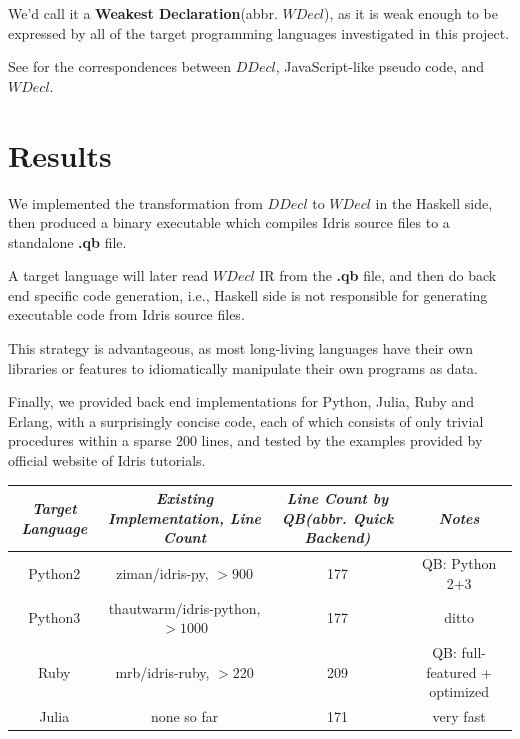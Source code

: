 \documentclass[a1,portrait]{a1poster}
\begin{document}
\begin{multicols}{2}
We'd call it a \textbf{Weakest Declaration}(abbr. $WDecl$), as it is weak enough to be expressed by
all of the target programming languages investigated in this project.

See  for the correspondences between $DDecl$, JavaScript-like pseudo code, and $WDecl$.

\color{FireBrick} %

\section*{Results}

We implemented the transformation from $DDecl$ to $WDecl$ in the Haskell side,
then produced a binary executable which compiles Idris source files to a standalone \textbf{.qb} file.

A target language will later read $WDecl$ IR from the \textbf{.qb} file,
and then do back end specific code generation, i.e., Haskell side
is not responsible for generating executable code from Idris source files.

This strategy is advantageous,
as most long-living languages have their own libraries or features
to idiomatically manipulate their own programs as data.

Finally, we provided back end implementations for Python, Julia, Ruby and Erlang,
with a surprisingly concise code, each of which consists of only
trivial procedures within a sparse 200 lines,
and tested by the examples provided by official website of Idris tutorials.

\begin{center}
\begin{tabular}{ |c|c|c|c } 
 \toprule
 \textit{Target Language} & \textit{Existing Implementation, Line Count} & \textit{Line Count by QB(abbr. Quick Backend)} & \textit{Notes} \\
 \midrule
 Python2 & ziman/idris-py, $> 900$ & 177 & QB: Python 2+3 \\
 Python3 & thautwarm/idris-python, $> 1000$ & 177 & ditto \\
 Ruby & mrb/idris-ruby, $> 220 $ &  209 & QB: full-featured + optimized \\
 Julia & none so far & 171 & very fast \\
 \bottomrule
\end{tabular}
\end{center}


\end{multicols}
\end{document}
